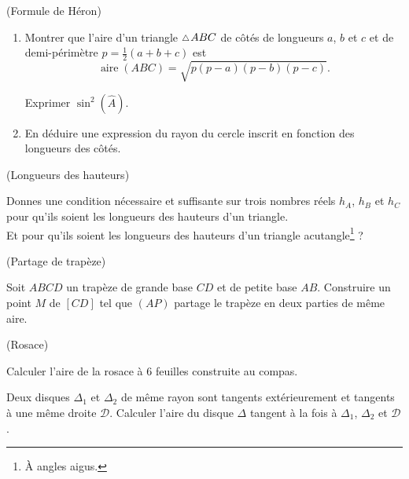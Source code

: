 \documentclass[a4paper,11pt,reqno]{amsart}
\DeclareMathOperator{\aire}{aire}
\begin{document}
\begin{exo} (Formule de Héron)

  \begin{enumerate}
    \item Montrer que l'aire d'un triangle $\tri ABC$ de côtés de longueurs $a$, $b$ et $c$ et de demi-périmètre $p=\frac{1}{2}(a+b+c)$ est
    $$
      \aire{(ABC)}=\sqrt{p(p-a)(p-b)(p-c)}.
    $$
    \begin{indication}
      Exprimer $\sin^2(\widehat{A})$.
    \end{indication}
    \item En déduire une expression du rayon du cercle inscrit en fonction des longueurs des côtés.
  \end{enumerate}
\end{exo}

\begin{exo} (Longueurs des hauteurs)

  Donnes une condition nécessaire et suffisante sur trois nombres réels $h_{A}$, $h_{B}$ et $h_{C}$ pour qu'ils soient les longueurs des hauteurs d'un triangle.\\
  Et pour qu'ils soient les longueurs des hauteurs d'un triangle acutangle\footnote{À angles aigus.} ?
\end{exo}

\begin{exo} (Partage de trapèze)

  Soit $ABCD$ un trapèze de grande base $CD$ et de petite base $AB$. Construire un point $M$ de $[CD]$ tel que $(AP)$ partage le trapèze en deux parties de même aire.
\end{exo}

\begin{exo} (Rosace)

  Calculer l'aire de la rosace à 6 feuilles construite au compas.
\end{exo}

\begin{exo}

  Deux disques $\Delta_1$ et $\Delta_2$ de même rayon sont tangents extérieurement et tangents à une même droite $\mathcal D$. Calculer l'aire du disque $\Delta$ tangent à la fois à $\Delta_1$, $\Delta_2$ et $\mathcal D$.
\end{exo}
\end{document}
